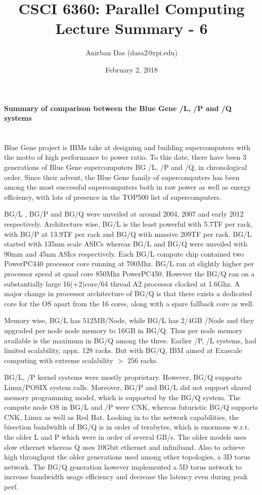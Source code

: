 \documentclass[a4paper,12 pt]{article}
\title{\vspace{-2.0cm}CSCI 6360: Parallel Computing Lecture Summary - 6}
\author{Anirban Das (dasa2@rpi.edu) }
\date{February 2, 2018}
\begin{document}
\maketitle

\paragraph{Summary of comparison between the Blue Gene /L, /P and /Q systems\\\\}

Blue Gene project is IBMs take at designing and building supercomputers with the motto of high performance to power ratio. To this date, there have been 3 generations of Blue Gene supercomputers BG /L, /P and /Q, in chronological order. Since their advent, the Blue Gene family of supercomputers has been among the most successful supercomputers both in raw power as well as energy efficiency, with lots of presence in the TOP500 list of supercomputers.

BG/L , BG/P and BG/Q were unveiled at around 2004, 2007 and early 2012 respectively. Architecture wise, BG/L is the least powerful with 5.7TF per rack, with BG/P at 13.9TF per rack and BG/Q with massive 209TF per rack. BG/L started with 135nm scale ASICs whereas BG/L and BG/Q were unveiled with 90mm and 45nm ASIcs respectively. Each BG/L compute chip contained two PowerPC440 processor core running at 700Mhz. BG/L ran at slightly higher per processor speed at quad core 850Mhz PowerPC450. However the BG/Q ran on a substantially large 16(+2)core/64 thread A2 processor clocked at 1.6Ghz. A major change in processor architecture of BG/Q is that there exists a dedicated core for the OS apart from the 16 cores, along with a spare fallback core as well.

Memory wise, BG/L has 512MB/Node, while BG/L has 2/4GB /Node and they upgraded per node node memory to 16GB in BG/Q. Thus per node memory available is the maximum in BG/Q among the three. Earlier /P, /L systems, had limited scalability, appx. 128 racks. But with BG/Q, IBM aimed at Exascale computing with extreme scalability $>$ 256 racks. 

BG/L, /P kernel systems were mostly proprietary. However, BG/Q supports Linux/POSIX system calls. Moreover, BG/P and BG/L did not support shared memory programming model, which is supported by the BG/Q system. The compute node OS in BG/L and /P were CNK, whereas futuristic BG/Q supports CNK, Linux as well as Red Hat. Looking in to the network capabilities,  the bisection bandwidth of BG/Q is in order of terabytes, which is enormous w.r.t. the older L and P which were in order of several GB/s. The older models uses slow ethernet whereas Q uses 10Gbit ethernet and infiniband. Also to achieve high throughput the older generations used among other topologies, a 3D torus network. The BG/Q generation however implemented a 5D torus network to increase bandwidth usage efficiency and decrease the latency even during peak perf.
\end{document}

